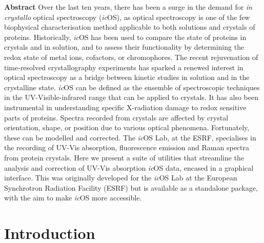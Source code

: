 \textbf{Abstract }Over the last ten years, there has been a surge in the demand for \textit{in crystallo} optical spectroscopy (\textit{ic}OS), as optical spectroscopy is one of the few biophysical characterisation method applicable to both solutions and crystals of proteins. Historically, \textit{ic}OS has been used to compare the state of proteins in crystals and in solution, and to assess their functionality by determining the redox state of metal ions, cofactors, or chromophores. The recent rejuvenation of time-resolved crystallography experiments has sparked a renewed interest in optical spectroscopy as a bridge between kinetic studies in solution and in the crystalline state. \textit{ic}OS can be defined as the ensemble of spectroscopic techniques in the UV-Visible-infrared range that can be applied to crystals. It has also been instrumental in understanding specific X-radiation damage to redox sensitive parts of proteins. Spectra recorded from crystals are affected by crystal orientation, shape, or position due to various optical phenomena. Fortunately, these can be modelled and corrected. The \textit{ic}OS Lab, at the ESRF, specialises in the recording of UV-Vis absorption, fluorescence emission and Raman spectra from protein crystals. Here we present a suite of utilities that streamline the analysis and correction of UV-Vis absorption \textit{ic}OS data, encased in a graphical interface. This was originally developed for the \textit{ic}OS Lab at the European Synchrotron Radiation Facility (ESRF) but is available as a standalone package, with the aim to make \textit{ic}OS more accessible.

\section{Introduction}

